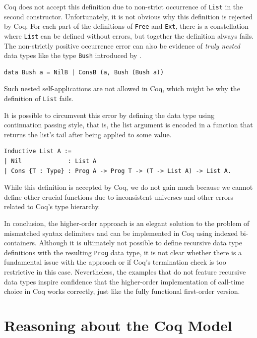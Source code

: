 \documentclass[a4paper, 11pt, fleqn, twoside]{scrreprt}
\newcommand{\hinl}[1]{\texttt{#1}}
\newcommand{\cinl}[1]{\texttt{#1}}
\begin{document}
Coq does not accept this definition due to non-strict occurrence of \cinl{List} in the second constructor.
Unfortunately, it is not obvious why this definition is rejected by Coq.
For each part of the definitions of \cinl{Free} and \cinl{Ext}, there is a constellation where \cinl{List} can be defined without errors, but together the definition always fails.
The non-strictly positive occurrence error can also be evidence of \textit{truly nested} data types like the type \hinl{Bush} introduced by \citet{bird1998nested}.

\begin{verbatim}
data Bush a = NilB | ConsB (a, Bush (Bush a))
\end{verbatim}

Such nested self-applications are not allowed in Coq, which might be why the definition of \cinl{List} fails.

It is possible to circumvent this error by defining the data type using continuation passing style, that is, the list argument is encoded in a function that returns the list's tail after being applied to some value.

\begin{verbatim}
Inductive List A :=
| Nil             : List A
| Cons {T : Type} : Prog A -> Prog T -> (T -> List A) -> List A.
\end{verbatim}

While this definition is accepted by Coq, we do not gain much because we cannot define other crucial functions due to inconsistent universes and other errors related to Coq's type hierarchy.

In conclusion, the higher-order approach is an elegant solution to the problem of mismatched syntax delimiters and can be implemented in Coq using indexed bi-containers.
Although it is ultimately not possible to define recursive data type definitions with the resulting \cinl{Prog} data type, it is not clear whether there is a fundamental issue with the approach or if Coq's termination check is too restrictive in this case.
Nevertheless, the examples that do not feature recursive data types inspire confidence that the higher-order implementation of call-time choice in Coq works correctly, just like the fully functional first-order version.

\chapter{Reasoning about the Coq Model}
\label{ch:progsInCoq}
\end{document}
